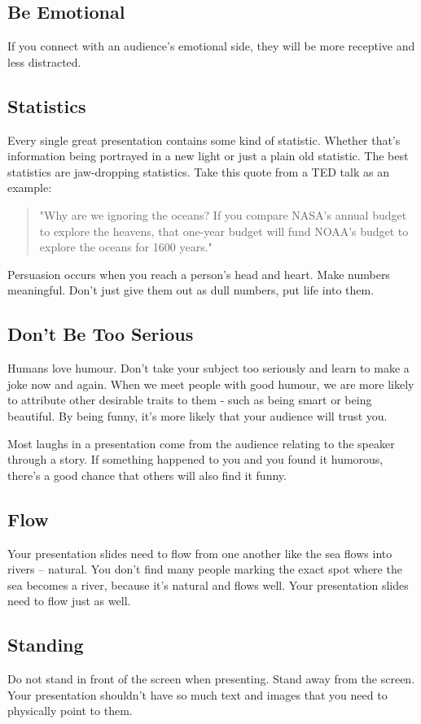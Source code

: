 \documentclass{article}
\begin{document}
\subsection{Be Emotional}
If you connect with an audience's emotional side, they will be more
receptive and less distracted.
\subsection{Statistics}
Every single great presentation contains some kind of statistic. Whether
that's information being portrayed in a new light or just a plain old
statistic. The best statistics are jaw-dropping statistics. Take this
quote from a TED talk as an example:
\begin{quote}
    "Why are we ignoring the oceans? If you compare NASA's annual budget to
explore the heavens, that one-year budget will fund NOAA's budget to
explore the oceans for 1600 years."
\end{quote}

Persuasion occurs when you reach a person's head and heart. Make numbers
meaningful. Don't just give them out as dull numbers, put life into
them.
\subsection{Don't Be Too Serious}
Humans love humour. Don't take your subject too seriously and learn to
make a joke now and again. When we meet people with good humour, we are
more likely to attribute other desirable traits to them - such as being
smart or being beautiful. By being funny, it's more likely that your
audience will trust you.

Most laughs in a presentation come from the audience relating to the
speaker through a story. If something happened to you and you found it
humorous, there's a good chance that others will also find it funny.
\subsection{Flow}
Your presentation slides need to flow from one another like the sea
flows into rivers -- natural. You don't find many people marking the
exact spot where the sea becomes a river, because it's natural and flows
well. Your presentation slides need to flow just as well.
\subsection{Standing}
Do not stand in front of the screen when presenting. Stand away from the
screen. Your presentation shouldn't have so much text and images that
you need to physically point to them.
\end{document}
